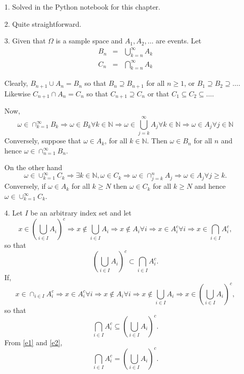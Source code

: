 \documentclass{article}
\newcommand{\son}{\mathbb{N}}
\begin{document}
\begin{enumerate}
\item[1.] Solved in the Python notebook for this chapter.

\item[2.] Quite straightforward.

\item[3.] Given that $\Omega$ is a sample space and $A_1, A_2, \ldots$ are
events. Let
\begin{eqnarray*}
B_n &=& \bigcup_{k=n}^\infty A_k \\
C_n &=& \bigcap_{k=n}^\infty A_k
\end{eqnarray*}

Clearly, $B_{n+1} \cup A_{n} = B_{n}$ so that $B_n \supseteq B_{n+1}$ for all $n
\ge 1$, or $B_1 \supseteq B_2 \supseteq \ldots$. Likewise $C_{n+1} \cap A_{n} = 
C_n$ so that $C_{n+1} \supseteq C_n$ or that $C_1 \subseteq C_2 \subseteq \ldots$.

Now,
\[
\omega \in \cap_{k=1}^\infty B_k \Rightarrow \omega \in B_k \forall k \in \son
\Rightarrow \omega \in \bigcup_{j=k}^\infty A_j \forall k \in \son \Rightarrow
\omega \in A_j \forall j \in \son
\]
Conversely, suppose that $\omega \in A_k$, for all $k \in \son$. Then $\omega \in
B_n$ for all $n$ and hence $\omega \in \cap_{n=1}^\infty B_n$.

On the other hand
\[
\omega \in \cup_{k=1}^\infty C_k \Rightarrow \exists k \in \son, \omega \in C_k
\Rightarrow \omega \in \cap_{j=k}^n A_j \Rightarrow \omega \in A_j \forall j
\ge k.
\]
Conversely, if $\omega \in A_k$ for all $k \ge N$ then $\omega \in C_k$ for all
$k \ge N$ and hence $\omega \in \cup_{k=1}^\infty C_k$.

\item[4.] Let $I$ be an arbitrary index set and let
\[
x \in \left(\bigcup_{i \in I}A_i\right)^c \Rightarrow x \notin \bigcup_{i \in I}A_i
\Rightarrow x \notin A_i \forall i \Rightarrow x \in A_i^c \forall i \Rightarrow 
x \in \bigcap_{i\in I}A_i^c,
\]
so that
\begin{equation}\label{e1}
\left(\bigcup_{i \in I}A_i\right)^c \subset \bigcap_{i\in I}A_i^c.
\end{equation}
If,
\[
x \in \cap_{i\in I}A_i^c \Rightarrow x \in A_i^c \forall i \Rightarrow
x \notin A_i \forall i \Rightarrow x \notin \bigcup_{i \in I}A_i
\Rightarrow x \in \left(\bigcup_{i \in I}A_i\right)^c,
\]
so that
\begin{equation}\label{e2}
\bigcap_{i\in I}A_i^c \subseteq \left(\bigcup_{i \in I}A_i\right)^c.
\end{equation}
From \eqref{e1} and \eqref{e2},
\[
\bigcap_{i\in I}A_i^c = \left(\bigcup_{i \in I}A_i\right)^c.
\]


\end{enumerate}
\end{document}
